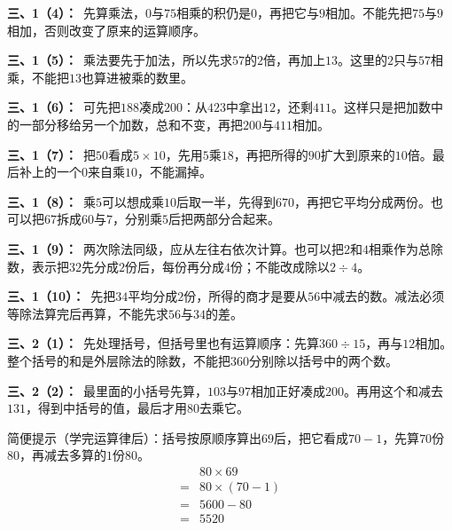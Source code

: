 \documentclass[multi=snippet,border=0pt]{standalone}
\newenvironment{snippet}[3]{\begin{minipage}{#1bp}\color{answerred}\fontsize{#2}{#3}\selectfont\raggedright}{\end{minipage}}
\begin{document}
\begin{snippet}{505}{11.5}{14}\textbf{三、1（4）：}\ 先算乘法，\(0\)与\(75\)相乘的积仍是\(0\)，再把它与\(9\)相加。不能先把\(75\)与\(9\)相加，否则改变了原来的运算顺序。\end{snippet}
\begin{snippet}{505}{11.5}{14}\textbf{三、1（5）：}\ 乘法要先于加法，所以先求\(57\)的\(2\)倍，再加上\(13\)。这里的\(2\)只与\(57\)相乘，不能把\(13\)也算进被乘的数里。\end{snippet}
\begin{snippet}{505}{11.5}{14}\textbf{三、1（6）：}\ 可先把\(188\)凑成\(200\)：从\(423\)中拿出\(12\)，还剩\(411\)。这样只是把加数中的一部分移给另一个加数，总和不变，再把\(200\)与\(411\)相加。\end{snippet}
\begin{snippet}{505}{11.5}{14}\textbf{三、1（7）：}\ 把\(50\)看成\(5\times10\)，先用\(5\)乘\(18\)，再把所得的\(90\)扩大到原来的\(10\)倍。最后补上的一个\(0\)来自乘\(10\)，不能漏掉。\end{snippet}
\begin{snippet}{505}{11.5}{14}\textbf{三、1（8）：}\ 乘\(5\)可以想成乘\(10\)后取一半，先得到\(670\)，再把它平均分成两份。也可以把\(67\)拆成\(60\)与\(7\)，分别乘\(5\)后把两部分合起来。\end{snippet}
\begin{snippet}{505}{11.5}{14}\textbf{三、1（9）：}\ 两次除法同级，应从左往右依次计算。也可以把\(2\)和\(4\)相乘作为总除数，表示把\(32\)先分成\(2\)份后，每份再分成\(4\)份；不能改成除以\(2\div4\)。\end{snippet}
\begin{snippet}{505}{11.5}{14}\textbf{三、1（10）：}\ 先把\(34\)平均分成\(2\)份，所得的商才是要从\(56\)中减去的数。减法必须等除法算完后再算，不能先求\(56\)与\(34\)的差。\end{snippet}
\begin{snippet}{505}{11.5}{14}\textbf{三、2（1）：}\ 先处理括号，但括号里也有运算顺序：先算\(360\div15\)，再与\(12\)相加。整个括号的和是外层除法的除数，不能把\(360\)分别除以括号中的两个数。\end{snippet}
\begin{snippet}{505}{11.5}{14}\textbf{三、2（2）：}\ 最里面的小括号先算，\(103\)与\(97\)相加正好凑成\(200\)。再用这个和减去\(131\)，得到中括号的值，最后才用\(80\)去乘它。\par 简便提示（学完运算律后）：括号按原顺序算出\(69\)后，把它看成\(70-1\)，先算\(70\)份\(80\)，再减去多算的\(1\)份\(80\)。\[\begin{aligned}&80\times69\\={}&80\times(70-1)\\={}&5600-80\\={}&5520\end{aligned}\]\end{snippet}
\end{document}

